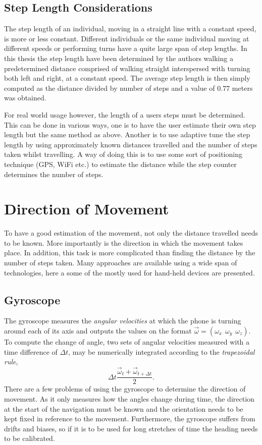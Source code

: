 \documentclass{LTHthesis}
\begin{document}
\subsection{Step Length Considerations}
%
The step length of an individual, moving in a straight line with a constant speed, is more or less constant. Different individuals or the same individual moving at different speeds or performing turns have a quite large span of step lengths. In this thesis the step length have been determined by the authors walking a predetermined distance comprised of walking straight interspersed with turning both left and right, at a constant speed. The average step length is then simply computed as the distance divided by number of steps and a value of $0.77$ meters was obtained.  

For real world usage however, the length of a users steps must be determined. This can be done in various ways, one is to have the user estimate their own step length but the same method as above. Another is to use adaptive tune the step length by using approximately known distances travelled and the number of steps taken whilst travelling. A way of doing this is to use some sort of positioning technique (GPS, WiFi etc.) to estimate the distance while the step counter determines the number of steps.      
%
\section{Direction of Movement}
%
To have a good estimation of the movement, not only the distance travelled needs to be known. More importantly is the direction in which the movement takes place. In addition, this task is more complicated than finding the distance by the number of steps taken. Many approaches are available using a wide span of technologies, here a some of the mostly used for hand-held devices are presented.  
%
\subsection{Gyroscope}
%
The gyroscope measures the \emph{angular velocities} at which the phone is turning around each of its axis and outputs the values on the format $\vec\omega = (\omega_x \hspace{5pt} \omega_y \hspace{5pt} \omega_z)$. To compute the change of angle, two sets of angular velocities measured with a time difference of $\Delta t$, may be numerically integrated according to the \emph{trapezoidal rule}, 
\begin{equation}
\Delta t \frac{\vec \omega _t +\vec \omega _{t+\Delta t}}{2}.
\end{equation} 
%
There are a few problems of using the gyroscope to determine the direction of movement. As it only measures how the angles change during time, the direction at the start of the navigation must be known and the orientation needs to be kept fixed in reference to the movement. Furthermore, the gyroscope suffers from drifts and biases, so if it is to be used for long stretches of time the heading needs to be calibrated. 
%
\end{document}

